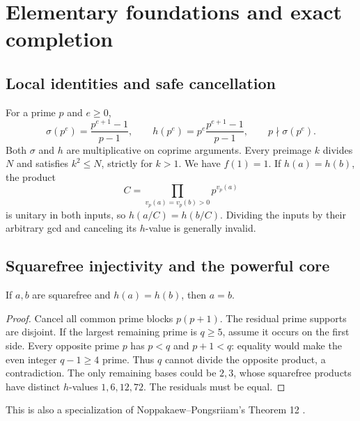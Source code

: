 \chapter{Elementary foundations and exact completion}\label{ch:foundations}

\section{Local identities and safe cancellation}
For a prime $p$ and $e\ge0$,
\[
 \sigma(p^e)=\frac{p^{e+1}-1}{p-1},\qquad
 h(p^e)=p^e\frac{p^{e+1}-1}{p-1},\qquad
 p\nmid\sigma(p^e).
\]
Both $\sigma$ and $h$ are multiplicative on coprime arguments. Every preimage
$k$ divides $N$ and satisfies $k^2\le N$, strictly for $k>1$. We have $f(1)=1$.
If $h(a)=h(b)$, the product
\[
 C=\prod_{v_p(a)=v_p(b)>0}p^{v_p(a)}
\]
is unitary in both inputs, so $h(a/C)=h(b/C)$. Dividing the inputs by their
arbitrary gcd and canceling its $h$-value is generally invalid.

\section{Squarefree injectivity and the powerful core}
\begin{lemma}\label{found:squarefree}
If $a,b$ are squarefree and $h(a)=h(b)$, then $a=b$.
\end{lemma}
\begin{proof}
Cancel all common prime blocks $p(p+1)$. The residual prime supports are disjoint.
If the largest remaining prime is $q\ge5$, assume it occurs on the first side.
Every opposite prime $p$ has $p<q$ and $p+1<q$: equality would make the even
integer $q-1\ge4$ prime. Thus $q$ cannot divide the opposite product, a
contradiction. The only remaining bases could be $2,3$, whose squarefree
products have distinct $h$-values $1,6,12,72$. The residuals must be equal.
\end{proof}
This is also a specialization of Noppakaew--Pongsriiam's Theorem 12 \cite{np}.

